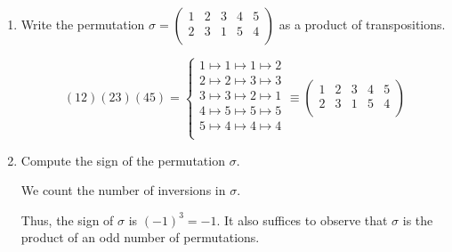 \documentclass{article}
\begin{document}
\begin{problem}
\begin{enumerate}[label=\bfalph]
	\item Write the permutation $\sigma = \begin{pmatrix}
			      1 & 2 & 3 & 4 & 5 \\
			      2 & 3 & 1 & 5 & 4 \\
		      \end{pmatrix}$ as a product of transpositions.
	      \begin{solution}
		      \[
			      (1 2)(2 3)(4 5) = \left\{\begin{aligned}
				      1 \mapsto 1 \mapsto 1 \mapsto 2 \\
				      2 \mapsto 2 \mapsto 3 \mapsto 3 \\
				      3 \mapsto 3 \mapsto 2 \mapsto 1 \\
				      4 \mapsto 5 \mapsto 5 \mapsto 5 \\
				      5 \mapsto 4 \mapsto 4 \mapsto 4 \\
			      \end{aligned}\right. \equiv \begin{pmatrix}
				      1 & 2 & 3 & 4 & 5 \\
				      2 & 3 & 1 & 5 & 4 \\
			      \end{pmatrix}
		      \]
	      \end{solution}

	\item Compute the sign of the permutation $\sigma$.
	      \begin{solution}
		      We count the number of inversions in $\sigma$.
		      \begin{center}
		      \end{center}
		      Thus, the sign of $\sigma$ is $(-1)^3 = -1$.
		      It also suffices to observe that $\sigma$ is the product of an odd number of permutations.
	      \end{solution}
\end{enumerate}
\end{problem}
\end{document}
